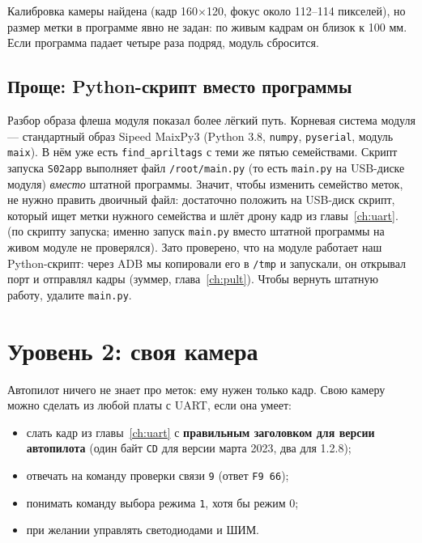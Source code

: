 \begin{vnimanie}[Ограничения]
Калибровка камеры найдена (кадр 160$\times$120, фокус около 112--114 пикселей), но размер метки в программе явно не задан: по живым кадрам он близок к 100 мм. Если программа падает четыре раза подряд, модуль сбросится.
\end{vnimanie}

\subsection*{Проще: Python-скрипт вместо программы}

Разбор образа флеша модуля показал более лёгкий путь. Корневая система модуля --- стандартный образ Sipeed MaixPy3 (Python 3.8, \texttt{numpy}, \texttt{pyserial}, модуль \texttt{maix}). В нём уже есть \texttt{find\_apriltags} с теми же пятью семействами. Скрипт запуска \texttt{S02app} выполняет файл \texttt{/root/main.py} (то есть \texttt{main.py} на USB-диске модуля) \emph{вместо} штатной программы. Значит, чтобы изменить семейство меток, не нужно править двоичный файл: достаточно положить на USB-диск скрипт, который ищет метки нужного семейства и шлёт дрону кадр из главы~\ref{ch:uart}. \vyv{} (по скрипту запуска; именно запуск \texttt{main.py} вместо штатной программы на живом модуле не проверялся). Зато проверено, что на модуле работает наш Python-скрипт: через ADB мы копировали его в \texttt{/tmp} и запускали, он открывал порт и отправлял кадры (зуммер, глава~\ref{ch:pult}). Чтобы вернуть штатную работу, удалите \texttt{main.py}.

\section{Уровень 2: своя камера}

Автопилот ничего не знает про меток: ему нужен только кадр. Свою камеру можно сделать из любой платы с UART, если она умеет:

\begin{itemize}
  \item слать кадр из главы~\ref{ch:uart} с \textbf{правильным заголовком для версии автопилота} (один байт \texttt{CD} для версии марта 2023, два для 1.2.8);
  \item отвечать на команду проверки связи \texttt{9} (ответ \texttt{F9 66});
  \item понимать команду выбора режима \texttt{1}, хотя бы режим 0;
  \item при желании управлять светодиодами и ШИМ.
\end{itemize}

